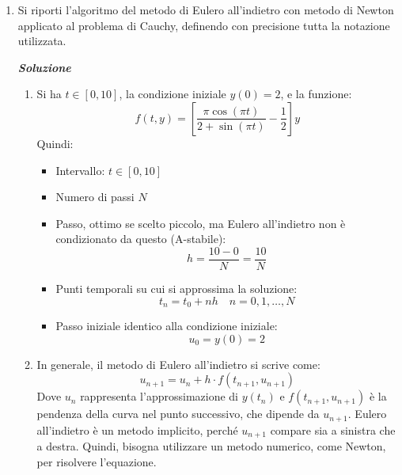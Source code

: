 \begin{enumerate}
    \item Si riporti l'algoritmo del metodo di Eulero all'indietro con metodo di Newton applicato al problema di Cauchy, definendo con precisione tutta la notazione utilizzata.

    \textcolor{Green3}{\textbf{\emph{Soluzione}}}
    \begin{enumerate}
        \item Si ha $t \in \left[0, 10\right]$, la condizione iniziale $y(0) = 2$, e la funzione:
        \begin{equation*}
            f(t, y) = \left[\dfrac{\pi \cos\left(\pi t\right)}{2 + \sin\left(\pi t\right)} - \dfrac{1}{2}\right] y
        \end{equation*}
        Quindi:
        \begin{itemize}
            \item Intervallo: $t \in \left[0, 10\right]$
            \item Numero di passi $N$
            \item Passo, ottimo se scelto piccolo, ma Eulero all'indietro non è condizionato da questo (A-stabile):
            \begin{equation*}
                h = \dfrac{10 - 0}{N} = \dfrac{10}{N}
            \end{equation*}
            \item Punti temporali su cui si approssima la soluzione:
            \begin{equation*}
                t_n = t_0 + n h \quad n = 0, 1, \dots, N
            \end{equation*}
            \item Passo iniziale identico alla condizione iniziale:
            \begin{equation*}
                u_0 = y(0) = 2
            \end{equation*}
        \end{itemize}

        \item In generale, il metodo di Eulero all'indietro si scrive come:
        \begin{equation*}
            u_{n+1} = u_{n} + h \cdot f\left(t_{n+1}, u_{n+1}\right)
        \end{equation*}
        Dove $u_{n}$ rappresenta l'approssimazione di $y(t_{n})$ e $f(t_{n+1}, u_{n+1})$ è la pendenza della curva nel punto successivo, che dipende da $u_{n+1}$. Eulero all'indietro è un metodo implicito, perché $u_{n+1}$ compare sia a sinistra che a destra. Quindi, bisogna utilizzare un metodo numerico, come Newton, per risolvere l'equazione.


\end{enumerate}
\end{enumerate}
